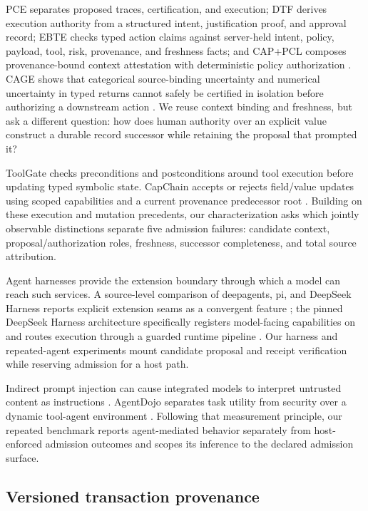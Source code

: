 PCE separates proposed traces, certification, and execution; DTF derives execution authority from a structured intent, justification proof, and approval record; EBTE checks typed action claims against server-held intent, policy, payload, tool, risk, provenance, and freshness facts; and CAP+PCL composes provenance-bound context attestation with deterministic policy authorization \citep{liu2026pce,he2026dtf,zhu2026ebte,chitan2026cappcl}. CAGE shows that categorical source-binding uncertainty and numerical uncertainty in typed returns cannot safely be certified in isolation before authorizing a downstream action \citep{delattre2026cage}. We reuse context binding and freshness, but ask a different question: how does human authority over an explicit value construct a durable record successor while retaining the proposal that prompted it?

ToolGate checks preconditions and postconditions around tool execution before updating typed symbolic state. CapChain accepts or rejects field/value updates using scoped capabilities and a current provenance predecessor root \citep{liu2026toolgate,choong2026capchain}. Building on these execution and mutation precedents, our characterization asks which jointly observable distinctions separate five admission failures: candidate context, proposal/authorization roles, freshness, successor completeness, and total source attribution.

Agent harnesses provide the extension boundary through which a model can reach such services. A source-level comparison of deepagents, pi, and DeepSeek Harness reports explicit extension seams as a convergent feature \citep{dai2026harnesses}; the pinned DeepSeek Harness architecture specifically registers model-facing capabilities on  and routes execution through a guarded runtime pipeline \citep{deepseek2026architecture}. Our harness and repeated-agent experiments mount candidate proposal and receipt verification while reserving admission for a host path.

Indirect prompt injection can cause integrated models to interpret untrusted content as instructions \citep{greshake2023indirect}. AgentDojo separates task utility from security over a dynamic tool-agent environment \citep{debenedetti2024agentdojo}. Following that measurement principle, our repeated benchmark reports agent-mediated behavior separately from host-enforced admission outcomes and scopes its inference to the declared admission surface.

\subsection{Versioned transaction provenance}

